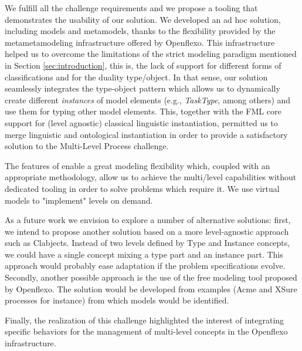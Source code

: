 

We fulfill all the challenge requirements and we propose a tooling that
demonstrates the usability of our solution. We developed an ad hoc solution,
including models and metamodels, thanks to the flexibility provided by the
metametamodeling infrastructure offered by Openflexo. This infrastructure helped us to overcome the limitations of the strict modeling paradigm mentioned in Section \ref{sec:introduction}, this is, the lack of support for different forms of classifications and for the duality type/object. In that sense, our solution seamlessly integrates the type-object pattern which allows us to dynamically create different \emph{instances} of model elements (e.g., \emph{TaskType}, among others) and use them for typing other model elements. This, together with the FML core support for (level agnostic) classical linguistic instantiation, permitted us to merge linguistic and ontological instantiation in order to provide a satisfactory solution to the Multi-Level Process challenge.

The features of \FML enable a great modeling flexibility which, coupled with an appropriate methodology, allow us to achieve
the multi/level capabilities without dedicated tooling in order to solve problems which require it. We use virtual models to "implement" levels on demand.

As a future work we envision to explore a number of alternative solutions:
first, we intend to propose another solution based on a more level-agnostic
approach such as Clabjects. Instead of two levels defined by Type and Instance
concepts, we could have a single concept mixing a type part and an instance
part. This approach would probably ease adaptation if the problem
specifications evolve. Secondly, another possible approach is the use of the
free modeling tool proposed by Openflexo. The solution would be developed from
examples (Acme and XSure processes for instance) from which models would be
identified. 

Finally, the realization of this challenge highlighted the interest
of integrating specific behaviors for the management of multi-level concepts in
the Openflexo infrastructure. %
